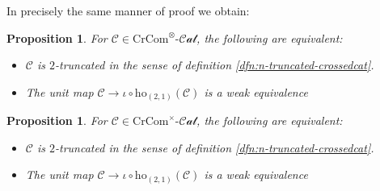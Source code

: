 \documentclass[12pt]{article}
\newtheorem{proposition}[theorem]{Proposition}
\theoremstyle{definition}
\newcommand{\C}{\mathcal{C}}
\newcommand{\crcom}{\text{CrCom}}
\newcommand{\cartcrossedcat}{\crcom^\times\text{-}\mathcal{Cat}}
\newcommand{\tensorcrossedcat}{\crcom^\otimes\text{-}\mathcal{Cat}}
\newcommand{\ho}{\text{ho}}
\newcommand{\hotwo}{\ho_{(2,1)}}
\begin{document}
	In precisely the same manner of proof we obtain:
	\begin{proposition}\label{prop:2-truncated-equivalent-tensorcrossed}
		For $\C \in \tensorcrossedcat$, the following are equivalent:
		\begin{itemize}
			\item $\C$ is $2$-truncated in the sense of definition \ref{dfn:n-truncated-crossedcat}.
			\item The unit map $\C \to \iota \circ \hotwo(\C)$ is a weak equivalence
		\end{itemize}
	\end{proposition}
	
	\begin{proposition}\label{prop:2-truncated-equivalent-cartcrossed}
		For $\C \in \cartcrossedcat$, the following are equivalent:
		\begin{itemize}
			\item $\C$ is $2$-truncated in the sense of definition \ref{dfn:n-truncated-crossedcat}.
			\item The unit map $\C \to \iota \circ \hotwo(\C)$ is a weak equivalence
		\end{itemize}
	\end{proposition}
	
\end{document}

